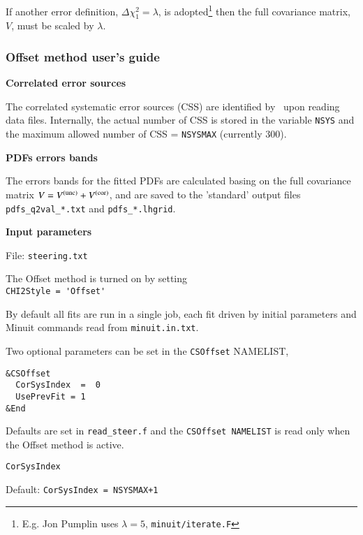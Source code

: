 If another error definition, $\Delta\chi_1^2 = \lambda$, 
is adopted\footnote{E.g. Jon Pumplin uses $\lambda=5$, \cf \texttt{minuit/iterate.F}} then
the full covariance matrix, $V$, must be scaled by $\lambda$. 

\subsubsection {Offset method user's guide}


{\bf {Correlated error sources}}

The correlated systematic error sources (CSS) are identified by \fitter\ upon reading data files.
Internally, the actual number of CSS 
is stored in the variable \verb'NSYS'
and the maximum allowed number of CSS = \verb'NSYSMAX' (currently 300).
\vspace{0.4cm}

{\bf {PDFs errors bands}}

The errors bands for the fitted PDFs are calculated 
basing on the full covariance matrix $V = \Vstat + \Vsys$,
and are saved to the 'standard' output files
\verb'pdfs_q2val_*.txt' and \verb'pdfs_*.lhgrid'.
\vspace{0.4cm}

{\bf {Input parameters}}

File: \verb'steering.txt'

The Offset method is turned on by setting\\
\verb:CHI2Style = 'Offset':

By default all fits are run in a single job, each fit driven by initial parameters and Minuit commands
read from \verb'minuit.in.txt'.

Two optional parameters can be set in the \verb'CSOffset' NAMELIST, \eg
\vspace*{-2.5ex}
\begin{verbatim}
&CSOffset
  CorSysIndex  =  0
  UsePrevFit = 1
&End
\end{verbatim}
\vspace*{-1ex}
Defaults are set in \verb'read_steer.f'
and the \verb'CSOffset NAMELIST' is read only when the Offset method is active.
\vspace{0.4cm}

{\tt CorSysIndex}

Default: \verb'CorSysIndex = NSYSMAX+1'

